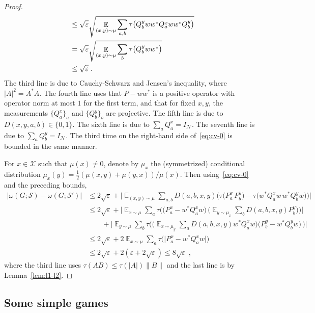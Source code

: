 \documentclass[11pt]{article}
\theoremstyle{definition}
\newcommand{\strategy}{\mathscr{S}}
\DeclareMathOperator*{\Expectation}{\mathbb{E}}
\newcommand{\Es}[1]{\Expectation_{#1}}
\newcommand{\mX}{\ensuremath{\mathcal{X}}}
\newcommand{\eps}{\varepsilon}
\newcommand{\mN}{\mathcal{N}}
\begin{document}
\begin{proof}
\begin{align}
&\leq \sqrt{\eps}\sqrt{ \Es{(x,y)\sim\mu}  \sum_{a,b}  \tau\big(Q^y_b ww^* Q^x_a w w^* Q^y_b \big) } \notag \\
&=\sqrt{\eps}\sqrt{ \Es{(x,y)\sim\mu}  \sum_{b}  \tau\big(Q^y_b ww^* \big) } \notag\\
&\leq \sqrt{\eps}\;.\label{eq:cv-1}
\end{align}
The third line is due to Cauchy-Schwarz and Jensen's inequality, where $|A|^2=A^*A$. The fourth line uses that $P - ww^*$ is a positive operator with operator norm at most $1$ for the first term, and that for fixed $x,y$, the measurements $\{ Q^x_a \}_a$ and $\{Q^y_b\}_b$ are projective. The fifth line is due to $D(x,y,a,b) \in \{0,1\}$. The sixth line is due to $\sum_a Q^x_a = I_\mN$. The seventh line is due to $\sum_a Q^y_b = I_\mN$. The third time on the right-hand side of~\eqref{eq:cv-0} is bounded in the same manner. 

For $x\in \mX$ such that $\mu(x)\neq 0$, denote by $\mu_x$ the (symmetrized) conditional distribution $\mu_x(y)=\frac{1}{2}(\mu(x,y)+\mu(y,x))/\mu(x)$. Then using~\eqref{eq:cv-0} and the preceding bounds,
\begin{align*}
\big|\omega(G;\strategy) - \omega(G;\strategy')\big|
 &\leq 2\sqrt{\eps}+ \Big|\Es{(x,y)\sim\mu} \sum_{a,b} D(a,b,x,y) \big( \tau\big( P^x_a \, P^y_b \big)-\tau\big( w^* Q^x_a w\, w^* Q^y_b w\big)\big)\Big|\\
&\leq  2\sqrt{\eps}+ \Big|\Es{x\sim\mu} \sum_{a}  \tau\Big( \big(P^x_a-w^* Q^x_aw\big) \, \Big( \Es{y\sim \mu_x} \sum_b D(a,b,x,y) P^y_b \Big)\Big)\Big|\\
&\qquad+ \Big|\Es{y\sim\mu} \sum_{b}  \tau\Big(\Big( \Es{x\sim \mu_y} \sum_a D(a,b,x,y) w^* Q^x_a w\Big) \big(P^y_b-w^*Q^y_bw\big) \, \Big)\Big|\\
&\leq 2\sqrt{\eps}+2\Es{x\sim\mu} \sum_{a}  \tau\big(\big| P^x_a-w^*Q^x_aw\big|\big) \\
&\leq 2\sqrt{\eps}+2(\eps + 2\sqrt{\eps}) \leq 8\sqrt{\eps}\;,
\end{align*}
where the third line uses $\tau(AB)\leq\tau(|A|)\|B\|$ and the last line is by Lemma~\ref{lem:l1-l2}.%
\end{proof}
	
\subsection{Some simple games}
\end{document}
